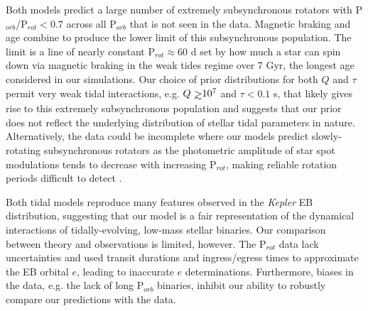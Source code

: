 \documentclass[twocolumn]{aastex61}
\def\gsim{~\rlap{$>$}{\lower 1.0ex\hbox{$\sim$}}}
\newcommand{\kepler}[0]{\textit{Kepler}\xspace}
\begin{document}
Both models predict a large number of extremely subsynchronous rotators with P$_{orb}/$P$_{rot} < 0.7$ across all P$_{orb}$ that is not seen in the \citet{Lurie2017} data. Magnetic braking and age combine to produce the lower limit of this subsynchronous population. The limit is a line of nearly constant P$_{rot} \approx 60$ d set by how much a star can spin down via magnetic braking in the weak tides regime over 7 Gyr, the longest age considered in our simulations. Our choice of prior distributions for both $Q$ and $\tau$ permit very weak tidal interactions, e.g. $Q \gsim 10^7$ and $\tau < 0.1$ s, that likely gives rise to this extremely subsynchronous population and suggests that our prior does not reflect the underlying distribution of stellar tidal parameters in nature. Alternatively, the data could be incomplete where our models predict slowly-rotating subsynchronous rotators as the photometric amplitude of star spot modulations tends to decrease with increasing P$_{rot}$, making reliable rotation periods difficult to detect \citep{McQuillan2014,Lurie2017,Reinhold2018}. 

Both tidal models reproduce many features observed in the \kepler EB distribution, suggesting that our model is a fair representation of the dynamical interactions of tidally-evolving, low-mass stellar binaries. Our comparison between theory and observations is limited, however. The \citet{Lurie2017} P$_{rot}$ data lack uncertainties and \citet{Lurie2017} used transit durations and ingress/egress times to approximate the EB orbital $e$, leading to inaccurate $e$ determinations. Furthermore, biases in the data, e.g. the lack of long P$_{orb}$ binaries, inhibit our ability to robustly compare our predictions with the data.
\end{document}
